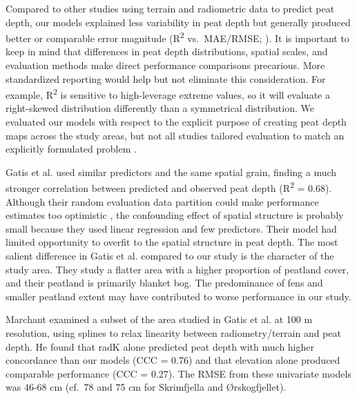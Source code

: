 \documentclass[soil, manuscript]{copernicus}
\begin{document}
Compared to other studies using terrain and radiometric data to predict peat depth, our models explained less variability in peat depth but generally produced better or comparable error magnitude (R\textsuperscript{2} vs.~MAE/RMSE; \citet{wadouxIntegratedApproachEvaluation2022}).
It is important to keep in mind that differences in peat depth distributions, spatial scales, and evaluation methods make direct performance comparisons precarious.
More standardized reporting would help but not eliminate this consideration.
For example, R\textsuperscript{2} is sensitive to high-leverage extreme values, so it will evaluate a right-skewed distribution differently than a symmetrical distribution.
We evaluated our models with respect to the explicit purpose of creating peat depth maps across the study areas, but not all studies tailored evaluation to match an explicitly formulated problem \citep{milaNearestNeighbourDistance2022}.

Gatis et al. \citeyearpar{gatisMappingUplandPeat2019} used similar predictors and the same spatial grain, finding a much stronger correlation between predicted and observed peat depth (R\textsuperscript{2} = 0.68).
Although their random evaluation data partition could make performance estimates too optimistic \citep{robertsCrossvalidationStrategiesData2017, wadouxSpatialCrossvalidationNot2021}, the confounding effect of spatial structure is probably small because they used linear regression and few predictors.
Their model had limited opportunity to overfit to the spatial structure in peat depth.
The most salient difference in Gatis et al. \citeyearpar{gatisMappingUplandPeat2019} compared to our study is the character of the study area.
They study a flatter area with a higher proportion of peatland cover, and their peatland is primarily blanket bog.
The predominance of fens and smaller peatland extent may have contributed to worse performance in our study.

Marchant \citeyearpar{marchantUsingRemoteSensors2021} examined a subset of the area studied in Gatis et al. \citeyearpar{gatisMappingUplandPeat2019} at 100 m resolution, using splines to relax linearity between radiometry/terrain and peat depth.
He found that radK alone predicted peat depth with much higher concordance than our models (CCC = 0.76) and that elevation alone produced comparable performance (CCC = 0.27).
The RMSE from these univariate models was 46-68 cm (cf.~78 and 75 cm for Skrimfjella and Ørskogfjellet).
\end{document}
